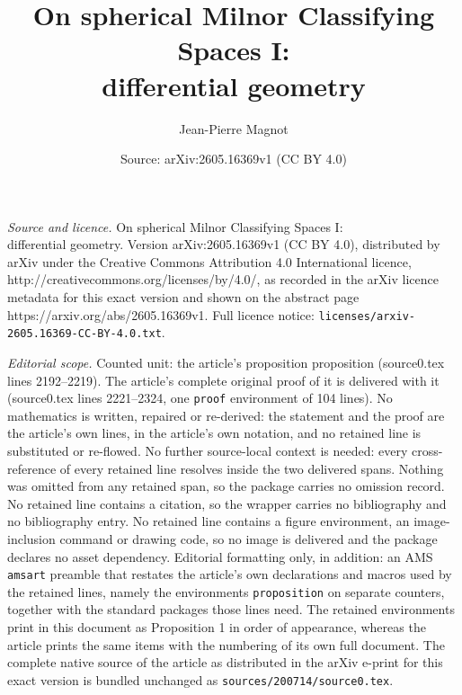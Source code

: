 \documentclass[10pt,a4paper]{amsart}
\title{On spherical Milnor Classifying Spaces I:\\ differential geometry}
\author{Jean-Pierre Magnot}
\date{Source: arXiv:2605.16369v1 (CC BY 4.0)}
\begin{document}
\maketitle

\noindent\emph{Source and licence.} On spherical Milnor Classifying Spaces I:\\ differential geometry. Version arXiv:2605.16369v1 (CC BY 4.0), distributed by arXiv under the Creative Commons Attribution 4.0 International licence, http://creativecommons.org/licenses/by/4.0/, as recorded in the arXiv licence metadata for this exact version and shown on the abstract page https://arxiv.org/abs/2605.16369v1. Full licence notice: \texttt{licenses/arxiv-2605.16369-CC-BY-4.0.txt}.\par\smallskip

\noindent\textit{Editorial scope.} Counted unit: the article's proposition proposition (source0.tex lines 2192--2219). The article's complete original proof of it is delivered with it (source0.tex lines 2221--2324, one \texttt{proof} environment of 104 lines). No mathematics is written, repaired or re-derived: the statement and the proof are the article's own lines, in the article's own notation, and no retained line is substituted or re-flowed.  No further source-local context is needed: every cross-reference of every retained line resolves inside the two delivered spans.  Nothing was omitted from any retained span, so the package carries no omission record.  No retained line contains a citation, so the wrapper carries no bibliography and no bibliography entry.  No retained line contains a figure environment, an image-inclusion command or drawing code, so no image is delivered and the package declares no asset dependency.  Editorial formatting only, in addition: an AMS \texttt{amsart} preamble that restates the article's own declarations and macros used by the retained lines, namely the environments \texttt{proposition} on separate counters, together with the standard packages those lines need.  The retained environments print in this document as Proposition 1 in order of appearance, whereas the article prints the same items with the numbering of its own full document.  The complete native source of the article as distributed in the arXiv e-print for this exact version is bundled unchanged as \texttt{sources/200714/source0.tex}.
\end{document}
